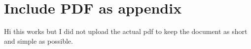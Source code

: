 \section{Include PDF as appendix}\label{app:VuAB_article}
Hi this works but I did not upload the actual pdf to keep the document as short and simple as possible.

